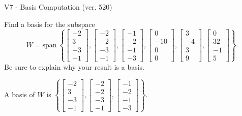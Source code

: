 \begin{exercise}
  \begin{exerciseTitle}V7 - Basis Computation (ver. 520)\end{exerciseTitle}
  \begin{exerciseStatement}
    Find a basis for the subspace 
\[W=\mathrm{span}\ \left\{\left[\begin{array}{r}
-2 \\
3 \\
-3 \\
-1
\end{array}\right] , \left[\begin{array}{r}
-2 \\
-2 \\
-3 \\
-1
\end{array}\right] , \left[\begin{array}{r}
-1 \\
-2 \\
-1 \\
-3
\end{array}\right] , \left[\begin{array}{r}
0 \\
-10 \\
0 \\
0
\end{array}\right] , \left[\begin{array}{r}
3 \\
-4 \\
3 \\
9
\end{array}\right] , \left[\begin{array}{r}
0 \\
32 \\
-1 \\
5
\end{array}\right]\right\}.\]
 Be sure to explain why your result is a basis.


  \end{exerciseStatement}
  \begin{exerciseAnswer}
   A basis of \(W\) is  \(\left\{\left[\begin{array}{r}
-2 \\
3 \\
-3 \\
-1
\end{array}\right] , \left[\begin{array}{r}
-2 \\
-2 \\
-3 \\
-1
\end{array}\right] , \left[\begin{array}{r}
-1 \\
-2 \\
-1 \\
-3
\end{array}\right]\right\}\).
  


  \end{exerciseAnswer}
\end{exercise}
